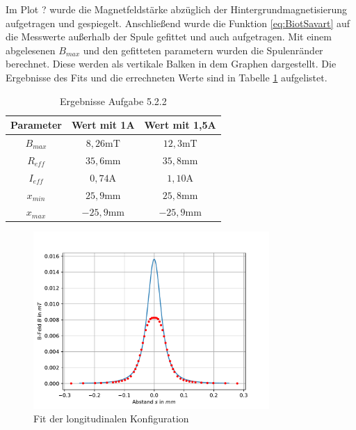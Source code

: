 \documentclass[11pt, a4paper]{article}
\begin{document}
    Im Plot ? wurde die Magnetfeldstärke abzüglich der Hintergrundmagnetisierung aufgetragen und gespiegelt. Anschließend wurde die Funktion \ref{eq:BiotSavart} auf die Messwerte außerhalb der Spule gefittet und auch aufgetragen. Mit einem abgelesenen $B_{max}$ und den gefitteten parametern wurden die Spulenränder berechnet. Diese werden als vertikale Balken in dem Graphen dargestellt. Die Ergebnisse des Fits und die errechneten Werte sind in Tabelle \ref{tab:fit} aufgelistet.
    \begin{table}[h]
        \centering
        \begin{tabular}{c | c | c}
            \textbf{Parameter} & \textbf{Wert mit 1A} & \textbf{Wert mit 1,5A} \\
            \hline
            $B_{max}$ & $8,26 \si{\milli\tesla}$ & $12,3 \si{\milli\tesla}$ \\
            $R_{eff}$ & $35,6 \si{\milli\metre}$ & $35,8 \si{\milli\metre}$ \\
            $I_{eff}$ & $0,74 \si{\ampere}$ & $1,10 \si{\ampere}$ \\
            $x_{min}$ & $25,9 \si{\milli\meter}$ & $25,8 \si{\milli\meter}$ \\
            $x_{max}$ & $-25,9 \si{\milli\meter}$ & $-25,9 \si{\milli\meter}$ \\
        \end{tabular}
        \caption{Ergebnisse Aufgabe 5.2.2}
        \label{tab:fit}
    \end{table}
    \begin{figure}
        \centering
        \includegraphics[width=0.8\textwidth]{fit1.pdf}
        \caption{Fit der longitudinalen Konfiguration}
        \label{fig:longfit}
    \end{figure}
\end{document}
